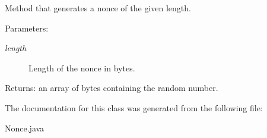 Method that generates a nonce of the given length. \begin{Desc}
\item[Parameters:]
\begin{description}
\item[{\em length}]Length of the nonce in bytes. \end{description}
\end{Desc}
\begin{Desc}
\item[Returns:]an array of bytes containing the random number. \end{Desc}


The documentation for this class was generated from the following file:\begin{CompactItemize}
\item 
Nonce.java\end{CompactItemize}
